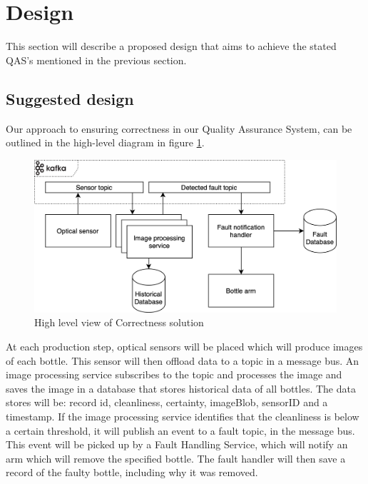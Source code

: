 \section{Design}
\label{sec:middleware_architecture}


This section will describe a proposed design that aims to achieve the stated QAS's mentioned in the previous section.

\subsection{Suggested design}
Our approach to ensuring correctness in our Quality Assurance System, can be outlined in the high-level diagram in figure \ref{fig:high-lvl-corr}.

\begin{figure}[h]
    \centering
    \includegraphics[width=\linewidth]{Images/arkiii.png}
    \caption{High level view of Correctness solution}
    \label{fig:high-lvl-corr}
\end{figure}

At each production step, optical sensors will be placed which will produce images of each bottle. This sensor will then offload data to a topic in a message bus. An image processing service subscribes to the topic and processes the image and saves the image in a database that stores historical data of all bottles. The data stores will be: record id, cleanliness, certainty, imageBlob, sensorID and a timestamp. If the image processing service identifies that the cleanliness is below a certain threshold, it will publish an event to a fault topic, in the message bus. This event will be picked up by a Fault Handling Service, which will notify an arm which will remove the specified bottle. The fault handler will then save a record of the faulty bottle, including why it was removed.

